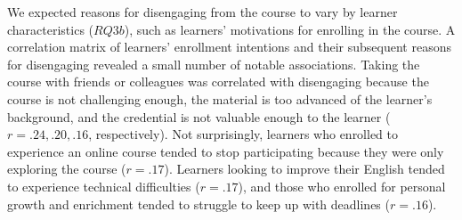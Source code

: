 \documentclass{sigchi}\usepackage[]{graphicx}\usepackage[]{color}
\begin{document}
We expected reasons for disengaging from the course to vary by learner characteristics ($RQ3b$), such as learners' motivations for enrolling in the course. A correlation matrix of learners' enrollment intentions and their subsequent reasons for disengaging revealed a small number of notable associations. Taking the course with friends or colleagues was correlated with disengaging because the course is not challenging enough, the material is too advanced of the learner's background, and the credential is not valuable enough to the learner ($r=.24, .20, .16$, respectively). Not surprisingly, learners who enrolled to experience an online course tended to stop participating because they were only exploring the course ($r=.17$). Learners looking to improve their English tended to experience technical difficulties ($r=.17$), and those who enrolled for personal growth and enrichment tended to struggle to keep up with deadlines ($r=.16$).
\end{document}

